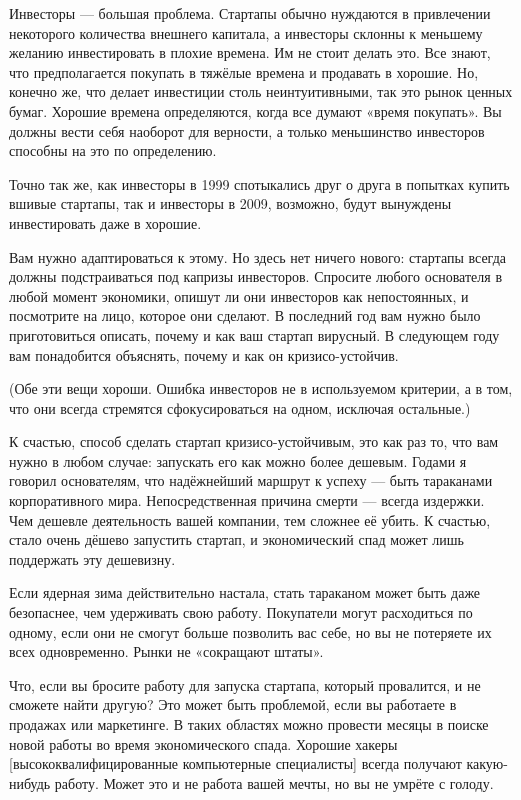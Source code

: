 \documentclass[ebook,12pt,oneside,openany]{memoir}
\begin{document}
Инвесторы — большая проблема. Стартапы обычно нуждаются в привлечении
некоторого количества внешнего капитала, а инвесторы склонны к
меньшему желанию инвестировать в плохие времена. Им не стоит делать
это. Все знают, что предполагается покупать в тяжёлые времена и
продавать в хорошие. Но, конечно же, что делает инвестиции столь
неинтуитивными, так это рынок ценных бумаг. Хорошие времена
определяются, когда все думают «время покупать». Вы должны вести себя
наоборот для верности, а только меньшинство инвесторов способны на это
по определению.

Точно так же, как инвесторы в 1999 спотыкались друг о друга в попытках
купить вшивые стартапы, так и инвесторы в 2009, возможно, будут
вынуждены инвестировать даже в хорошие.

Вам нужно адаптироваться к этому. Но здесь нет ничего нового: стартапы
всегда должны подстраиваться под капризы инвесторов. Спросите любого
основателя в любой момент экономики, опишут ли они инвесторов как
непостоянных, и посмотрите на лицо, которое они сделают. В последний
год вам нужно было приготовиться описать, почему и как ваш стартап
вирусный. В следующем году вам понадобится объяснять, почему и как он
кризисо-устойчив.

(Обе эти вещи хороши. Ошибка инвесторов не в используемом критерии, а
в том, что они всегда стремятся сфокусироваться на одном, исключая
остальные.)

К счастью, способ сделать стартап кризисо-устойчивым, это как раз то,
что вам нужно в любом случае: запускать его как можно более дешевым.
Годами я говорил основателям, что надёжнейший маршрут к успеху — быть
тараканами корпоративного мира. Непосредственная причина смерти —
всегда издержки. Чем дешевле деятельность вашей компании, тем сложнее
её убить. К счастью, стало очень дёшево запустить стартап, и
экономический спад может лишь поддержать эту дешевизну.

Если ядерная зима действительно настала, стать тараканом может быть
даже безопаснее, чем удерживать свою работу. Покупатели могут
расходиться по одному, если они не смогут больше позволить вас себе,
но вы не потеряете их всех одновременно. Рынки не «сокращают штаты».

Что, если вы бросите работу для запуска стартапа, который провалится,
и не сможете найти другую? Это может быть проблемой, если вы работаете
в продажах или маркетинге. В таких областях можно провести месяцы в
поиске новой работы во время экономического спада. Хорошие хакеры
[высококвалифицированные компьютерные специалисты] всегда получают
какую-нибудь работу. Может это и не работа вашей мечты, но вы не
умрёте с голоду.
\end{document}
